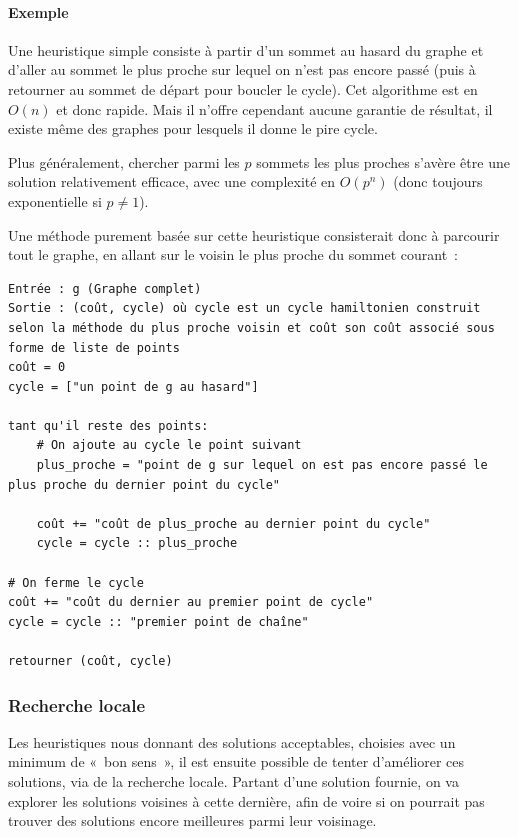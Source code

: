     \paragraph{Exemple} Une heuristique simple consiste à partir d'un sommet au
    hasard du graphe et d'aller au sommet le plus proche sur lequel on n'est
    pas encore passé (puis à retourner au sommet de départ pour boucler le
    cycle). Cet algorithme est en $O(n)$ et donc rapide. Mais il n'offre
    cependant aucune garantie de résultat, il existe même des graphes pour
    lesquels il donne le pire cycle.

    Plus généralement, chercher parmi les $p$ sommets les plus proches s'avère
    être une solution relativement efficace, avec une complexité en $O(p^n)$
    (donc toujours exponentielle si $p \neq 1$).

    Une méthode purement basée sur cette heuristique consisterait donc à parcourir
    tout le graphe, en allant sur le voisin le plus proche du sommet courant~:

    \begin{lstlisting}
Entrée : g (Graphe complet)
Sortie : (coût, cycle) où cycle est un cycle hamiltonien construit selon la méthode du plus proche voisin et coût son coût associé sous forme de liste de points
coût = 0
cycle = ["un point de g au hasard"]

tant qu'il reste des points:
    # On ajoute au cycle le point suivant
    plus_proche = "point de g sur lequel on est pas encore passé le plus proche du dernier point du cycle"

    coût += "coût de plus_proche au dernier point du cycle"
    cycle = cycle :: plus_proche

# On ferme le cycle
coût += "coût du dernier au premier point de cycle"
cycle = cycle :: "premier point de chaîne"

retourner (coût, cycle)
    \end{lstlisting}

  \subsubsection{Recherche locale}

    Les heuristiques nous donnant des solutions acceptables, choisies avec un
    minimum de «~bon sens~», il est ensuite possible de tenter d'améliorer
    ces solutions, via de la recherche locale.
    Partant d'une solution fournie, on va explorer les solutions voisines
    à cette dernière, afin de voire si on pourrait pas trouver des solutions
    encore meilleures parmi leur voisinage.


